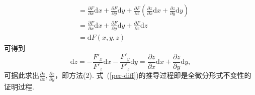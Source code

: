 \documentclass[12pt,UTF8]{ctexart}
\begin{document}
\begin{enumerate}
\begin{equation}
\begin{split}
&=\frac{\partial F}{\partial x}\mathrm dx+\frac{\partial F}{\partial y}\mathrm dy+\frac{\partial F}{\partial z}(\frac{\partial z}{\partial x}\mathrm dx+\frac{\partial z}{\partial y}\mathrm dy)\\
&=\frac{\partial F}{\partial x}\mathrm dx+\frac{\partial F}{\partial y}\mathrm dy+\frac{\partial F}{\partial z}\mathrm dz\\
&=\mathrm dF(x,y,z)
\end{split}\end{equation}
可得到
\[
\mathrm dz=-\frac{F'_x}{F'_z}\mathrm dx-\frac{F'_y}{F'_z}\mathrm dy=\frac{\partial z}{\partial x}\mathrm dx+\frac{\partial z}{\partial y}\mathrm dy,
\]
可据此求出$\frac{\partial z}{\partial x},\frac{\partial z}{\partial y}$，即方法(2). 式~(\ref{per-diff})的推导过程即是全微分形式不变性的证明过程.
\end{enumerate}
\end{document}
